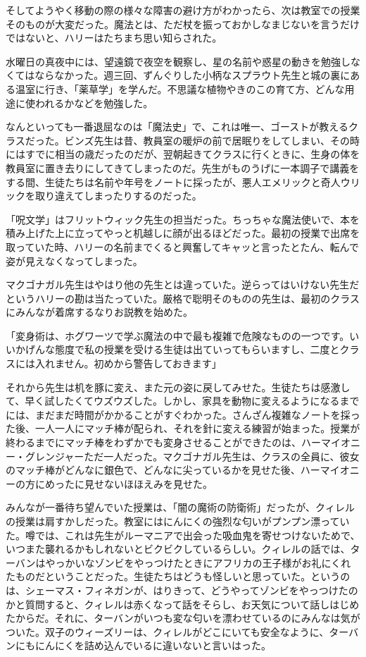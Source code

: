 \documentclass[10pt,a4paper]{article}
\begin{document}
\begin{CJK}{UTF8}{min}
そしてようやく移動の際の様々な障害の避け方がわかったら、次は教室での授業そのものが大変だった。魔法とは、ただ杖を振っておかしなまじないを言うだけではないと、ハリーはたちまち思い知らされた。

水曜日の真夜中には、望遠鏡で夜空を観察し、星の名前や惑星の動きを勉強しなくてはならなかった。週三回、ずんぐりした小柄なスプラウト先生と城の裏にある温室に行き、「薬草学」を学んだ。不思議な植物やきのこの育て方、どんな用途に使われるかなどを勉強した。

なんといっても一番退屈なのは「魔法史」で、これは唯一、ゴーストが教えるクラスだった。ビンズ先生は昔、教員室の暖炉の前で居眠りをしてしまい、その時にはすでに相当の歳だったのだが、翌朝起きてクラスに行くときに、生身の体を教員室に置き去りにしてきてしまったのだ。先生がものうげに一本調子で講義をする間、生徒たちは名前や年号をノートに採ったが、悪人エメリックと奇人ウリックを取り違えてしまったりするのだった。

「呪文学」はフリットウィック先生の担当だった。ちっちゃな魔法使いで、本を積み上げた上に立ってやっと机越しに顔が出るほどだった。最初の授業で出席を取っていた時、ハリーの名前までくると興奮してキャッと言ったとたん、転んで姿が見えなくなってしまった。

マクゴナガル先生はやはり他の先生とは違っていた。逆らってはいけない先生だというハリーの勘は当たっていた。厳格で聡明そのものの先生は、最初のクラスにみんなが着席するなりお説教を始めた。

「変身術は、ホグワーツで学ぶ魔法の中で最も複雑で危険なものの一つです。いいかげんな態度で私の授業を受ける生徒は出ていってもらいますし、二度とクラスには入れません。初めから警告しておきます」

それから先生は机を豚に変え、また元の姿に戻してみせた。生徒たちは感激して、早く試したくてウズウズした。しかし、家具を動物に変えるようになるまでには、まだまだ時間がかかることがすぐわかった。さんざん複雑なノートを採った後、一人一人にマッチ棒が配られ、それを針に変える練習が始まった。授業が終わるまでにマッチ棒をわずかでも変身させることができたのは、ハーマイオニー・グレンジャーただ一人だった。マクゴナガル先生は、クラスの全員に、彼女のマッチ棒がどんなに銀色で、どんなに尖っているかを見せた後、ハーマイオニーの方にめったに見せないほほえみを見せた。

みんなが一番待ち望んでいた授業は、「闇の魔術の防衛術」だったが、クィレルの授業は肩すかしだった。教室にはにんにくの強烈な匂いがプンプン漂っていた。噂では、これは先生がルーマニアで出会った吸血鬼を寄せつけないためで、いつまた襲れるかもしれないとビクビクしているらしい。クィレルの話では、ターバンはやっかいなゾンビをやっつけたときにアフリカの王子様がお礼にくれたものだということだった。生徒たちはどうも怪しいと思っていた。というのは、シェーマス・フィネガンが、はりきって、どうやってゾンビをやっつけたのかと質問すると、クィレルは赤くなって話をそらし、お天気について話しはじめたからだ。それに、ターバンがいつも変な匂いを漂わせているのにみんなは気がついた。双子のウィーズリーは、クィレルがどこにいても安全なように、ターバンにもにんにくを詰め込んでいるに違いないと言いはった。


\end{CJK}
\end{document}
